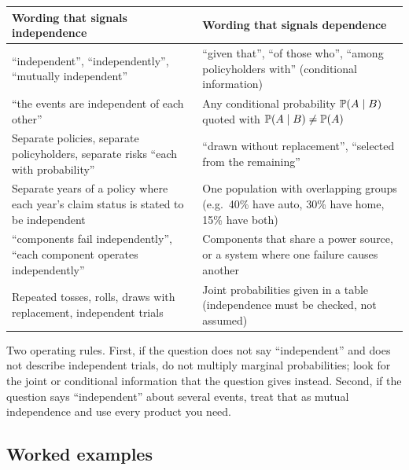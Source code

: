 \begin{center}
\begin{tabular}{@{}p{}p{}@{}}
\toprule
\textbf{Wording that signals independence} & \textbf{Wording that signals dependence} \\
\midrule
``independent'', ``independently'', ``mutually independent'' &
``given that'', ``of those who'', ``among policyholders with'' (conditional information) \\[3pt]
``the events are independent of each other'' &
Any conditional probability $\mathbb{P}(A \mid B)$ quoted with $\mathbb{P}(A \mid B) \ne \mathbb{P}(A)$ \\[3pt]
Separate policies, separate policyholders, separate risks ``each with probability'' &
``drawn without replacement'', ``selected from the remaining'' \\[3pt]
Separate years of a policy where each year's claim status is stated to be independent &
One population with overlapping groups (e.g.\ 40\% have auto, 30\% have home, 15\% have both) \\[3pt]
``components fail independently'', ``each component operates independently'' &
Components that share a power source, or a system where one failure causes another \\[3pt]
Repeated tosses, rolls, draws with replacement, independent trials &
Joint probabilities given in a table (independence must be checked, not assumed) \\
\bottomrule
\end{tabular}
\end{center}

Two operating rules. First, if the question does not say ``independent'' and does not describe independent trials, do not multiply marginal probabilities; look for the joint or conditional information that the question gives instead. Second, if the question says ``independent'' about several events, treat that as mutual independence and use every product you need.

\subsection{Worked examples}


